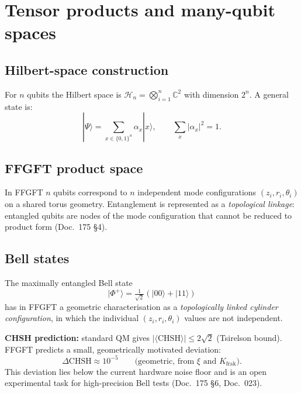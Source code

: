 \section{Tensor products and many-qubit spaces}

\subsection{Hilbert-space construction}

For $n$ qubits the Hilbert space is
$\mathcal{H}_n = \bigotimes_{i=1}^{n} \mathbb{C}^2$ with dimension
$2^n$. A general state is:
\begin{equation}
  |\Psi\rangle = \sum_{x \in \{0,1\}^n} \alpha_x |x\rangle,
  \qquad
  \sum_x |\alpha_x|^2 = 1.
\end{equation}

\subsection{FFGFT product space}

In FFGFT $n$ qubits correspond to $n$ independent mode configurations
$(z_i, r_i, \theta_i)$ on a shared torus geometry. Entanglement is
represented as a \emph{topological linkage}: entangled qubits are
nodes of the mode configuration that cannot be reduced to product
form (Doc.~175 §4).

\subsection{Bell states}

The maximally entangled Bell state
\begin{equation}
  |\Phi^+\rangle = \tfrac{1}{\sqrt{2}}(|00\rangle + |11\rangle)
\end{equation}
has in FFGFT a geometric characterisation as a \emph{topologically
linked cylinder configuration}, in which the individual
$(z_i, r_i, \theta_i)$ values are not independent.

\textbf{CHSH prediction:} standard QM gives
$|\langle\text{CHSH}\rangle| \leq 2\sqrt{2}$ (Tsirelson bound).
FFGFT predicts a small, geometrically motivated deviation:
\begin{equation}
  \Delta\text{CHSH} \approx 10^{-5}
  \qquad\text{(geometric, from $\xi$ and $K_{\text{frak}}$)}.
\end{equation}
This deviation lies below the current hardware noise floor and is
an open experimental task for high-precision Bell tests
(Doc.~175 §6, Doc.~023).

